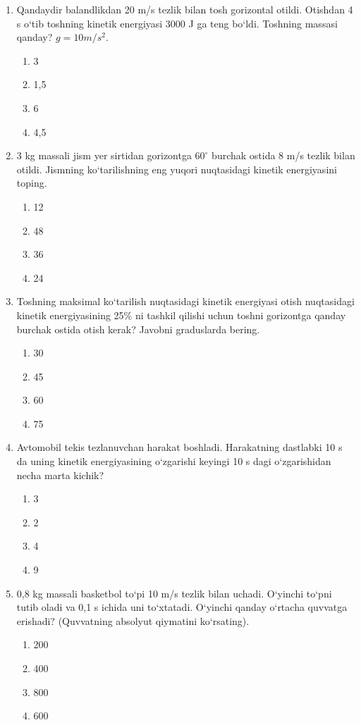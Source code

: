 \begin{enumerate}
\item Qandaydir balandlikdan 20 m/s tezlik bilan tosh gorizontal otildi. Otishdan 4 s o‘tib toshning kinetik energiyasi 3000 J ga teng bo‘ldi. Toshning massasi qanday? $g = 10 m/s^2$.
\begin{enumerate}[label=\Alph*)]
\item 3
\item 1,5
\item 6
\item 4,5
\end{enumerate}

\item 3 kg massali jism yer sirtidan gorizontga $60^\circ$ burchak ostida 8 m/s tezlik bilan otildi. Jismning ko‘tarilishning eng yuqori nuqtasidagi kinetik energiyasini toping.
\begin{enumerate}[label=\Alph*)]
\item 12
\item 48
\item 36
\item 24
\end{enumerate}

\item Toshning maksimal ko‘tarilish nuqtasidagi kinetik energiyasi otish nuqtasidagi kinetik energiyasining 25\% ni tashkil qilishi uchun toshni gorizontga qanday burchak ostida otish kerak? Javobni graduslarda bering.
\begin{enumerate}[label=\Alph*)]
\item 30
\item 45
\item 60
\item 75
\end{enumerate}

\item Avtomobil tekis tezlanuvchan harakat boshladi. Harakatning dastlabki 10 s da uning kinetik energiyasining o‘zgarishi keyingi 10 s dagi o‘zgarishidan necha marta kichik?
\begin{enumerate}[label=\Alph*)]
\item 3
\item 2
\item 4
\item 9
\end{enumerate}

\item 0,8 kg massali basketbol to‘pi 10 m/s tezlik bilan uchadi. O‘yinchi to‘pni tutib oladi va 0,1 s ichida uni to‘xtatadi. O‘yinchi qanday o‘rtacha quvvatga erishadi? (Quvvatning absolyut qiymatini ko‘rsating).
\begin{enumerate}[label=\Alph*)]
\item 200
\item 400
\item 800
\item 600
\end{enumerate}


\end{enumerate}
